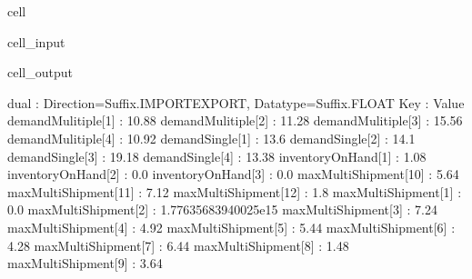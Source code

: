 \documentclass[letterpaper,10pt,english]{jupyterBook}
\begin{document}
\begin{sphinxuseclass}{cell}\begin{sphinxVerbatimInput}

\begin{sphinxuseclass}{cell_input}
\begin{sphinxVerbatim}[commandchars=\\\{\}]
\end{sphinxVerbatim}

\end{sphinxuseclass}\end{sphinxVerbatimInput}
\begin{sphinxVerbatimOutput}

\begin{sphinxuseclass}{cell_output}
\begin{sphinxVerbatim}[commandchars=\\\{\}]
dual : Direction=Suffix.IMPORT\PYGZus{}EXPORT, Datatype=Suffix.FLOAT
    Key                  : Value
      demandMulitiple[1] :                 10.88
      demandMulitiple[2] :                 11.28
      demandMulitiple[3] :                 15.56
      demandMulitiple[4] :                 10.92
         demandSingle[1] :                  13.6
         demandSingle[2] :                  14.1
         demandSingle[3] :                 19.18
         demandSingle[4] :                 13.38
      inventoryOnHand[1] :                 \PYGZhy{}1.08
      inventoryOnHand[2] :                   0.0
      inventoryOnHand[3] :                   0.0
    maxMultiShipment[10] :                 \PYGZhy{}5.64
    maxMultiShipment[11] :                 \PYGZhy{}7.12
    maxMultiShipment[12] :                  \PYGZhy{}1.8
     maxMultiShipment[1] :                   0.0
     maxMultiShipment[2] : \PYGZhy{}1.77635683940025e\PYGZhy{}15
     maxMultiShipment[3] :                 \PYGZhy{}7.24
     maxMultiShipment[4] :                 \PYGZhy{}4.92
     maxMultiShipment[5] :                 \PYGZhy{}5.44
     maxMultiShipment[6] :                 \PYGZhy{}4.28
     maxMultiShipment[7] :                 \PYGZhy{}6.44
     maxMultiShipment[8] :                 \PYGZhy{}1.48
     maxMultiShipment[9] :                 \PYGZhy{}3.64
\end{sphinxVerbatim}

\end{sphinxuseclass}\end{sphinxVerbatimOutput}

\end{sphinxuseclass}
\sphinxstepscope
\end{document}
